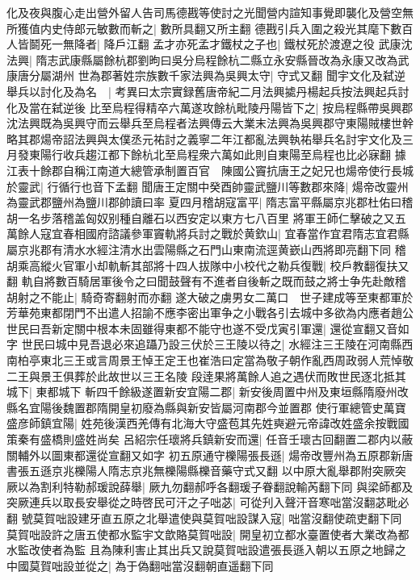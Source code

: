 化及夜與腹心走出營外留人告司馬德戡等使討之光聞營内諠知事覺即襲化及營空無所獲值内史侍郎元敏數而斬之|{
	數所具翻又所主翻}
德戡引兵入圍之殺光其麾下數百人皆鬬死一無降者|{
	降戶江翻}
孟才亦死孟才鐵杖之子也|{
	鐵杖死於渡遼之役}
武康沈法興|{
	隋志武康縣屬餘杭郡劉昫曰吳分烏程餘杭二縣立永安縣晉改為永康又改為武康唐分屬湖州}
世為郡著姓宗族數千家法興為吳興太守|{
	守式又翻}
聞宇文化及弑逆舉兵以討化及為名　|{
	考異曰太宗實録舊唐帝紀二月法興㨿丹楊起兵按法興起兵討化及當在弑逆後}
比至烏程得精卒六萬遂攻餘杭毗陵丹陽皆下之|{
	按烏程縣帶吳興郡沈法興既為吳興守而云舉兵至烏程者法興傳云大業末法興為吳興郡守東陽賊樓世幹略其郡煬帝詔法興與太僕丞元祐討之義寧二年江都亂法興執祐舉兵名討宇文化及三月發東陽行收兵趨江都下餘杭北至烏程衆六萬如此則自東陽至烏程也比必寐翻}
據江表十餘郡自稱江南道大總管承制置百官　陳國公竇抗唐王之妃兄也煬帝使行長城於靈武|{
	行循行也音下孟翻}
聞唐王定關中癸酉帥靈武鹽川等數郡來降|{
	煬帝改靈州為靈武郡鹽州為鹽川郡帥讀曰率}
夏四月稽胡寇富平|{
	隋志富平縣屬京兆郡杜佑曰稽胡一名步落稽盖匈奴别種自離石以西安定以東方七八百里}
將軍王師仁擊破之又五萬餘人寇宜春相國府諮議參軍竇軌將兵討之戰於黄欽山|{
	宜春當作宜君隋志宜君縣屬京兆郡有清水水經注清水出雲陽縣之石門山東南流逕黄嶔山西將即亮翻下同}
稽胡乘高縱火官軍小却軌斬其部將十四人拔隊中小校代之勒兵復戰|{
	校戶教翻復扶又翻}
軌自將數百騎居軍後令之曰聞鼓聲有不進者自後斬之既而鼓之將士争先赴敵稽胡射之不能止|{
	騎奇寄翻射而亦翻}
遂大破之虜男女二萬口　世子建成等至東都軍於芳華苑東都閉門不出遣人招諭不應李密出軍争之小戰各引去城中多欲為内應者趙公世民曰吾新定關中根本未固雖得東都不能守也遂不受戊寅引軍還|{
	還從宣翻又音如字}
世民曰城中見吾退必來追躡乃設三伏於三王陵以待之|{
	水經注三王陵在河南縣西南柏亭東北三王或言周景王悼王定王也崔浩曰定當為敬子朝作亂西周政弱人荒悼敬二王與景王俱葬於此故世以三王名陵}
段逹果將萬餘人追之遇伏而敗世民逐北抵其城下|{
	東都城下}
斬四千餘級遂置新安宜陽二郡|{
	新安後周置中州及東垣縣隋廢州改縣名宜陽後魏置郡隋開皇初廢為縣與新安皆屬河南郡今並置郡}
使行軍總管史萬寶盛彦師鎮宜陽|{
	姓苑後漢西羌傳有北海大守盛苞其先姓奭避元帝諱改姓盛余按戰國策秦有盛橋則盛姓尚矣}
呂紹宗任瓌將兵鎮新安而還|{
	任音壬瓌古回翻置二郡内以蔽關輔外以圖東都還從宣翻又如字}
初五原通守櫟陽張長遜|{
	煬帝改豐州為五原郡新唐書張五遜京兆櫟陽人隋志京兆無櫟陽縣櫟音藥守式又翻}
以中原大亂舉郡附突厥突厥以為割利特勒郝瑗說薛舉|{
	厥九勿翻郝呼各翻瑗子眷翻說輸芮翻下同}
與梁師都及突厥連兵以取長安舉從之時啓民可汗之子咄苾|{
	可從刋入聲汗音寒咄當沒翻苾毗必翻}
號莫賀咄設建牙直五原之北舉遣使與莫賀咄設謀入寇|{
	咄當沒翻使疏吏翻下同}
莫賀咄設許之唐五使都水監宇文歆賂莫賀咄設|{
	開皇初立都水臺置使者大業改為都水監改使者為監}
且為陳利害止其出兵又說莫賀咄設遣張長遜入朝以五原之地歸之中國莫賀咄設並從之|{
	為于偽翻咄當沒翻朝直遥翻下同}
